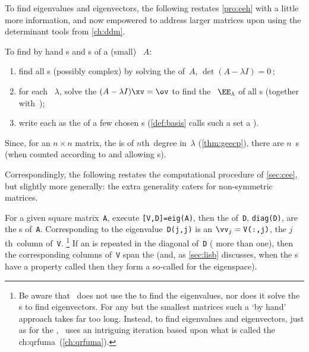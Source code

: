 To find eigenvalues and eigenvectors, the following restates \autoref{pro:eeh} with a little more information, and now empowered to address larger matrices upon using the determinant tools from \autoref{ch:ddm}.

\begin{procedure} \label{pro:geneig}
To find by hand s and s of a (small) ~\(A\):
\begin{enumerate}
\item find all s (possibly complex) by solving the  of~\(A\), \(\det(A-\lambda I)=0\)\,;
\item for each ~\(\lambda\), solve the   \((A-\lambda I)\xv=\ov\) to find the ~\(\EE_\lambda\) of all s (together with~\ov);
\item write each  as the  of a few chosen s  (\autoref{def:basis} calls such a set a ).
\end{enumerate}
Since, for an \(n\times n\) matrix, the  is of \(n\)th~degree in~\(\lambda\) (\autoref{thm:geecp}), there are \(n\)~s (when counted according to  and allowing s).
\end{procedure}

Correspondingly, the following restates the computational procedure of \autoref{sec:cee}, but slightly more generally: the extra generality caters for non-symmetric matrices.

\begin{compute}
For a given square matrix~\verb|A|, execute \verb|[V,D]=eig(A)|, then 
the  of~\verb|D|, \verb|diag(D)|, are the s of~\verb|A|. 
Corresponding to the eigenvalue~\verb|D(j,j)| is an   \(\vv_j=\verb|V(:,j)|\), the \(j\)th~column of~\verb|V|.  
\footnote{Be aware that \script\ does not use the  to find the eigenvalues, nor does it solve the s to find eigenvectors.  
For any but the smallest matrices such a `by hand' approach takes far too long.  
Instead, to find eigenvalues and eigenvectors, just as for the \svd, \script\ uses an intriguing iteration based upon what is called the \ifcsname ch:qrfuma\endcsname\ (\autoref{ch:qrfuma})\fi.}
If an  is repeated in the diagonal of~\verb|D| ( more than one), then the corresponding columns of~\verb|V| span the  
(and, as \autoref{sec:lisb} discusses, when the s have a property called  then they form a so-called  for the eigenspace). 
\end{compute}



